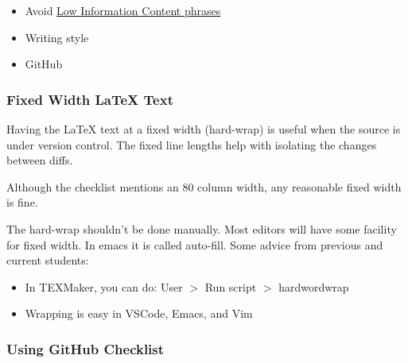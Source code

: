 \documentclass[12pt]{article}
\begin{document}
\begin{itemize}
\item Avoid
\href{https://www.brafton.com/blog/content-writing/anti-fluff-content-writing/}
{Low Information Content phrases}


\item Writing style

\item GitHub

\end{itemize}

\subsubsection*{Fixed Width \LaTeX{} Text}

Having the \LaTeX{} text at a fixed width (hard-wrap) is useful when the source
is under version control.  The fixed line lengths help with isolating the
changes between diffs.

Although the checklist mentions an 80 column width, any reasonable fixed width
is fine.

The hard-wrap shouldn't be done manually.  Most editors will have some facility
for fixed width.  In emacs it is called auto-fill.  Some advice from previous
and current students:

\begin{itemize}
\item In TEXMaker, you can do: User $>$ Run script $>$ hardwordwrap
\item Wrapping is easy in VSCode, Emacs, and Vim
\end{itemize}

\subsubsection*{Using GitHub Checklist}
\end{document}
